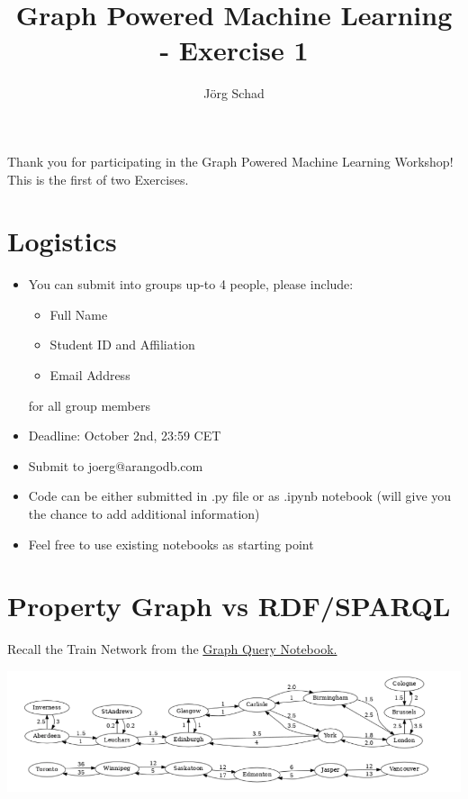 \documentclass[12pt,a4paper]{article}
\title{Graph Powered Machine Learning - Exercise  1}
\author{J{\"o}rg Schad}
\begin{document}
\maketitle

Thank you for participating in the Graph Powered Machine Learning Workshop! This is the first of two Exercises.

\section*{Logistics}

\begin{itemize}
  \item You can submit into groups up-to 4 people, please include: 
  \begin{itemize}
  \item Full Name
  \item Student ID and Affiliation
  \item Email Address
  \end{itemize} for all group members
  \item Deadline: October 2nd, 23:59 CET
  \item Submit to joerg@arangodb.com
  \item Code can be either submitted in .py file or as .ipynb notebook (will give you the chance to add additional information)
  \item Feel free to use existing notebooks as starting point

\end{itemize}


\section{Property Graph vs RDF/SPARQL}
Recall the Train Network from the \href{https://colab.research.google.com/github/joerg84/Graph_Powered_ML_Workshop/blob/master/Graphs_Queries.ipynb#scrollTo=UR9vgfDa-8_n}{Graph Query Notebook.}  

\includegraphics[scale=0.5]{Exercise_1/train_network.png}
\end{document}

